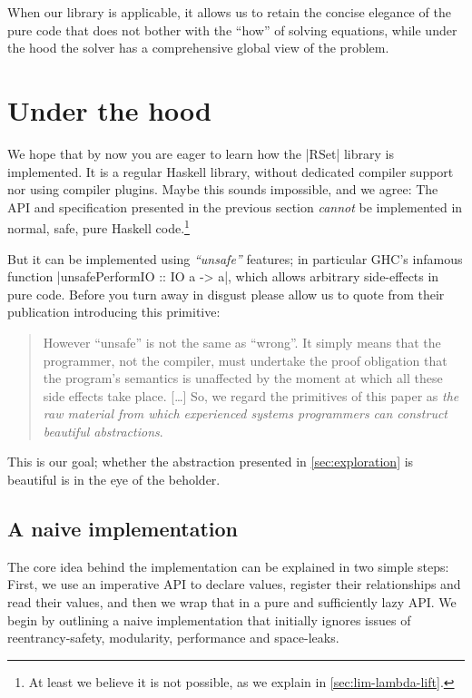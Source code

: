 \documentclass[manuscript,screen,acmsmall,nonacm]{acmart}
\begin{document}
When our library is applicable, it allows us to retain the concise elegance of the pure code that does not bother with the “how” of solving equations, while under the hood the solver has a comprehensive global view of the problem.


\section{Under the hood}\label{sec:impl}

We hope that by now you are eager to learn how the |RSet| library is implemented. It is a regular Haskell library, without dedicated compiler support nor using compiler plugins. Maybe this sounds impossible, and we agree: The API and specification presented in the previous section \emph{cannot} be implemented in normal, safe, pure Haskell code.\footnote{At least we believe it is not possible, as we explain in \cref{sec:lim-lambda-lift}.}

But it can be implemented using \emph{“unsafe”} features; in particular GHC's infamous function |unsafePerformIO :: IO a -> a|, which allows arbitrary side-effects in pure code. Before you turn away in disgust please allow us to quote \citet{unsafePerformIO} from their publication introducing this primitive:
\begin{quote}
However “unsafe” is not the same as “wrong”. It simply means that the programmer, not the compiler, must undertake the proof obligation that the program's semantics is unaffected by the moment at which all these side effects take place. [\ldots]
So, we regard the primitives of this paper as \emph{the raw material from which experienced systems programmers can construct beautiful abstractions}.
\end{quote}
This is our goal; whether the abstraction presented in \cref{sec:exploration} is beautiful is in the eye of the beholder.

\subsection{A naive implementation}

The core idea behind the implementation can be explained in two simple steps: First, we use an imperative API to declare values, register their relationships and read their values, and then we wrap that in a pure and sufficiently lazy API. We begin by outlining a naive implementation that initially ignores issues of reentrancy-safety, modularity, performance and space-leaks.
\end{document}
